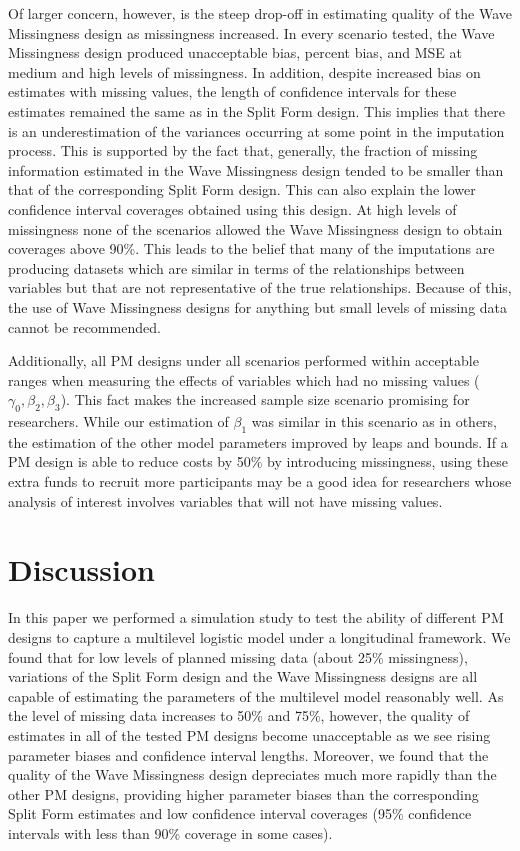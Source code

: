 \documentclass{svjour3}                     %
\begin{document}
Of larger concern, however, is the steep drop-off in estimating quality of the Wave Missingness design as missingness increased. In every scenario tested, the Wave Missingness design produced unacceptable bias, percent bias, and MSE at medium and high levels of missingness. In addition, despite increased bias on estimates with missing values, the length of confidence intervals for these estimates remained the same as in the Split Form design. This implies that there is an underestimation of the variances occurring at some point in the imputation process. This is supported by the fact that, generally, the fraction of missing information estimated in the Wave Missingness design tended to be smaller than that of the corresponding Split Form design. This can also explain the lower confidence interval coverages obtained using this design. At high levels of missingness none of the scenarios allowed the Wave Missingness design to obtain coverages above 90\%. This leads to the belief that many of the imputations are producing datasets which are similar in terms of the relationships between variables but that are not representative of the true relationships. Because of this, the use of Wave Missingness designs for anything but small levels of missing data cannot be recommended. \par

Additionally, all PM designs under all scenarios performed within acceptable ranges when measuring the effects of variables which had no missing values ($\gamma_0, \beta_2, \beta_3$). This fact makes the increased sample size scenario promising for researchers. While our estimation of $\beta_1$ was similar in this scenario as in others, the estimation of the other model parameters improved by leaps and bounds. If a PM design is able to reduce costs by 50\% by introducing missingness, using these extra funds to recruit more participants may be a good idea for researchers whose analysis of interest involves variables that will not have missing values. \par

\section{Discussion}
\label{4}
In this paper we performed a simulation study to test the ability of different PM designs to capture a multilevel logistic model under a longitudinal framework. We found that for low levels of planned missing data (about 25\% missingness), variations of the Split Form design and the Wave Missingness designs are all capable of estimating the parameters of the multilevel model reasonably well. As the level of missing data increases to 50\% and 75\%, however, the quality of estimates in all of the tested PM designs become unacceptable as we see rising parameter biases and confidence interval lengths. Moreover, we found that the quality of the Wave Missingness design depreciates much more rapidly than the other PM designs, providing higher parameter biases than the corresponding Split Form estimates and low confidence interval coverages (95\% confidence intervals with less than 90\% coverage in some cases). \par
\end{document}
